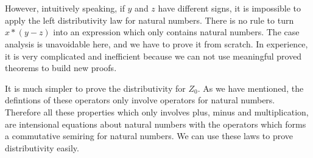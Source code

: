\begin{code}
\\
\>[4]\<[19]%
\>[19]      \AgdaSymbol{(}  \AgdaSymbol{))} \AgdaSymbol{(} \AgdaSymbol{(}  \AgdaSymbol{)))))}\<%
\\
\>[13]\<[2]%
\>[2]\<%
\\
\>[0]\<[4]%
\>[4] \AgdaSymbol{:}          \AgdaSymbol{(}  \AgdaSymbol{(} \AgdaSymbol{))}  \AgdaSymbol{(}  \AgdaSymbol{)}\<%
\\
\>[0]\<[4]%
\>[4]   \AgdaSymbol{=}  \AgdaSymbol{(} \AgdaSymbol{\_)}\<%
\\
\>[0]\<[4]%
\>[4]  \AgdaSymbol{(} \AgdaSymbol{)} \AgdaSymbol{=} \<%
\\
\>[0]\<[4]%
\>[4]  \AgdaSymbol{(} \AgdaSymbol{)} \AgdaSymbol{=} \<%
\\
\end{code}


However, intuitively speaking, if $y$ and $z$ have different
signs, it is impossible to apply the left distributivity law for
natural numbers. There is no rule to turn $x *
(y  - z)$ into an expression which only contains natural numbers.
The case analysis is unavoidable here, and we have to prove it from scratch.
In experience, it is very complicated and inefficient because we can not use meaningful proved theorems to build new proofs.

It is much simpler to prove the distributivity for $Z_0$. As we have mentioned, the defintions of 
these operators only involve operators for natural
numbers. Therefore all these properties which only
involves plus, minus and multiplication, are intensional equations about natural numbers with the operators which forms a commutative semiring for natural numbers. We can use these laws to prove distributivity easily.

